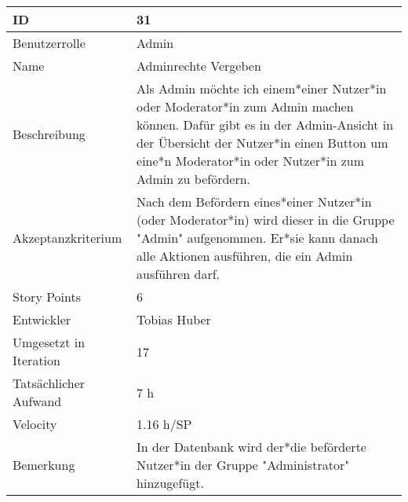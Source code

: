 \begin{tabularx}{\textwidth}{|p{}|X|}
	\hline
	ID & 31 \\
	\hline
	Benutzerrolle & Admin \\
	\hline
	Name & Adminrechte Vergeben\\
	\hline
	Beschreibung & Als Admin möchte ich einem*einer Nutzer*in oder Moderator*in zum Admin machen können. Dafür gibt es in der Admin-Ansicht in der Übersicht der Nutzer*in einen Button um eine*n Moderator*in oder Nutzer*in zum Admin zu befördern.  \\
	\hline
	Akzeptanzkriterium & Nach dem Befördern eines*einer Nutzer*in (oder Moderator*in) wird dieser in die Gruppe "Admin" aufgenommen. Er*sie kann danach alle Aktionen ausführen, die ein Admin ausführen darf. \\
	\hline
	Story Points & 6 \\
	\hline
	Entwickler &  Tobias Huber\\
	\hline
	Umgesetzt in Iteration & 17\\
	\hline
	Tatsächlicher Aufwand & 7 h\\
	\hline
	Velocity & 1.16 h/SP\\
	\hline
	Bemerkung & In der Datenbank wird der*die beförderte Nutzer*in der Gruppe "Administrator" hinzugefügt. \\
	\hline
\end{tabularx}
\vspace{20pt}
